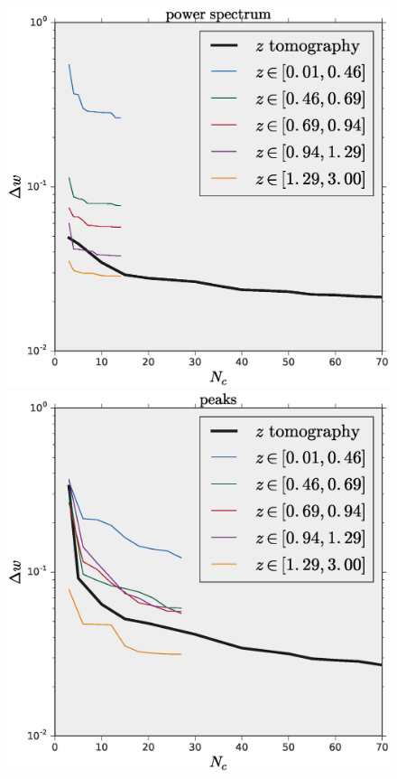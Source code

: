 \documentclass[reprint,aps,prd,superscriptaddress,showkeys,showpacs]{revtex4-1}
\begin{document}
\begin{figure}
\includegraphics[scale=0.3]{Figures/w_power_spectrum_pca.eps}
\includegraphics[scale=0.3]{Figures/w_peaks_pca.eps}

\end{figure}
\end{document}
